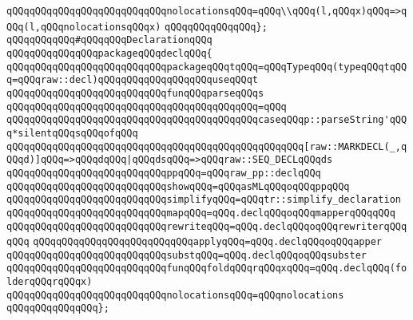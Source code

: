 \verb|qQQqqQQqqQQqqQQqqQQqqQQqqQQqnolocationsqQQq=qQQq\\qQQq(l,qQQqx)qQQq=>qQQq(l,qQQqnolocationsqQQqx)|\newline
\verb|qQQqqQQqqQQqqQQq};|\newline
\newline
\verb|qQQqqQQqqQQq#qQQqqQQqDeclarationqQQq|\newline
\verb|qQQqqQQqqQQqqQQqpackageqQQqdeclqQQq{|\newline
\newline
\verb|qQQqqQQqqQQqqQQqqQQqqQQqqQQqpackageqQQqtqQQq=qQQqTypeqQQq(typeqQQqtqQQq=qQQqraw::decl)qQQqqQQqqQQqqQQqqQQquseqQQqt|\newline
\newline
\verb|qQQqqQQqqQQqqQQqqQQqqQQqqQQqfunqQQqparseqQQqs|\newline
\verb|qQQqqQQqqQQqqQQqqQQqqQQqqQQqqQQqqQQqqQQqqQQq=qQQq|\newline
\verb|qQQqqQQqqQQqqQQqqQQqqQQqqQQqqQQqqQQqqQQqqQQqcaseqQQqp::parseString'qQQq*silentqQQqsqQQqofqQQq|\newline
\verb|qQQqqQQqqQQqqQQqqQQqqQQqqQQqqQQqqQQqqQQqqQQqqQQqqQQq[raw::MARKDECL(_,qQQqd)]qQQq=>qQQqdqQQq|\verb#|qQQqdsqQQq=>qQQqraw::SEQ_DECLqQQqds#\newline
\newline
\verb|qQQqqQQqqQQqqQQqqQQqqQQqqQQqppqQQq=qQQqraw_pp::declqQQq|\newline
\verb|qQQqqQQqqQQqqQQqqQQqqQQqqQQqshowqQQq=qQQqasMLqQQqoqQQqppqQQq|\newline
\verb|qQQqqQQqqQQqqQQqqQQqqQQqqQQqsimplifyqQQq=qQQqtr::simplify_declaration|\newline
\verb|qQQqqQQqqQQqqQQqqQQqqQQqqQQqmapqQQq=qQQq.declqQQqoqQQqmapperqQQqqQQq|\newline
\verb|qQQqqQQqqQQqqQQqqQQqqQQqqQQqrewriteqQQq=qQQq.declqQQqoqQQqrewriterqQQqqQQq|\newline
\verb|qQQqqQQqqQQqqQQqqQQqqQQqqQQqapplyqQQq=qQQq.declqQQqoqQQqapper|\newline
\verb|qQQqqQQqqQQqqQQqqQQqqQQqqQQqsubstqQQq=qQQq.declqQQqoqQQqsubster|\newline
\newline
\verb|qQQqqQQqqQQqqQQqqQQqqQQqqQQqfunqQQqfoldqQQqrqQQqxqQQq=qQQq.declqQQq(folderqQQqrqQQqx)|\newline
\newline
\verb|qQQqqQQqqQQqqQQqqQQqqQQqqQQqnolocationsqQQq=qQQqnolocations|\newline
\verb|qQQqqQQqqQQqqQQq};|\newline
